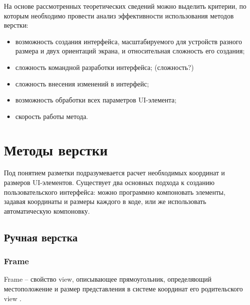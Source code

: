 На основе рассмотренных теоретических сведений можно выделить критерии, по которым необходимо провести анализ эффективности использования методов верстки:

\begin{itemize}
	\item возможность создания интерфейса, масштабируемого для устройств разного размера и двух ориентаций экрана, и относительная сложность его создания;
	\item сложность командной разработки интерфейса; (сложность?)
	\item сложность внесения изменений в интерфейс;
	\item возможность обработки всех параметров UI-элемента;
	\item скорость работы метода.
\end{itemize}

\chapter{Методы верстки}

Под понятием разметки подразумевается расчет необходимых координат и размеров UI-элементов.
Существует два основных подхода к созданию пользовательского интерфейса: можно программно компоновать элементы, задавая координаты и размеры каждого в коде, или же использовать автоматическую компоновку.

\section{Ручная верстка}

\subsection{Frame}

Frame \cite{frame} -- свойство view, описывающее прямоугольник, определяющий местоположение и размер представления в системе координат его родительского view \cite{superview}.

